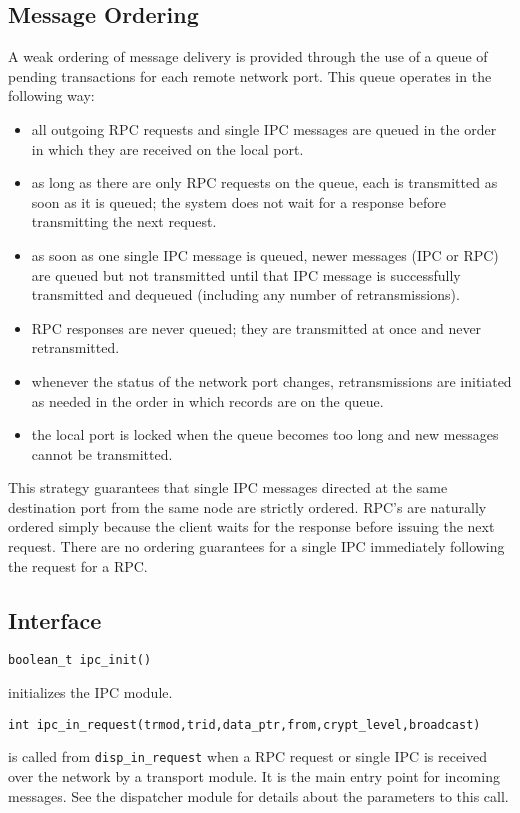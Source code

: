 \subsection{Message Ordering}
A weak ordering of message delivery is provided through the use of a
queue of pending transactions for each remote network port. This queue
operates in the following way:
\begin{itemize}
\item all outgoing RPC requests and single IPC messages are queued in
the order in which they are received on the local port.

\item as long as there are only RPC requests on the queue, each is
transmitted as soon as it is queued; the system does not wait for a
response before transmitting the next request.

\item as soon as one single IPC message is queued, newer messages (IPC
or RPC) are queued but not transmitted until that IPC message is
successfully transmitted and dequeued (including any number of
retransmissions).

\item RPC responses are never queued; they are transmitted at once and
never retransmitted.

\item whenever the status of the network port changes, retransmissions
are initiated as needed in the order in which records are on the
queue.

\item the local port is locked when the queue becomes too long and new
messages cannot be transmitted.
\end{itemize}

This strategy guarantees that single IPC messages directed at the same
destination port from the same node are strictly ordered. RPC's are
naturally ordered simply because the client waits for the response
before issuing the next request. There are no ordering guarantees for
a single IPC immediately following the request for a RPC.

\subsection{Interface}
\begin{verbatim}
boolean_t ipc_init()
\end{verbatim}
initializes the IPC module.

\begin{verbatim}
int ipc_in_request(trmod,trid,data_ptr,from,crypt_level,broadcast)
\end{verbatim}
is called from \verb"disp_in_request" when a RPC request or single IPC
is received over the network by a transport module. It is the main
entry point for incoming messages. See the dispatcher module for
details about the parameters to this call.

